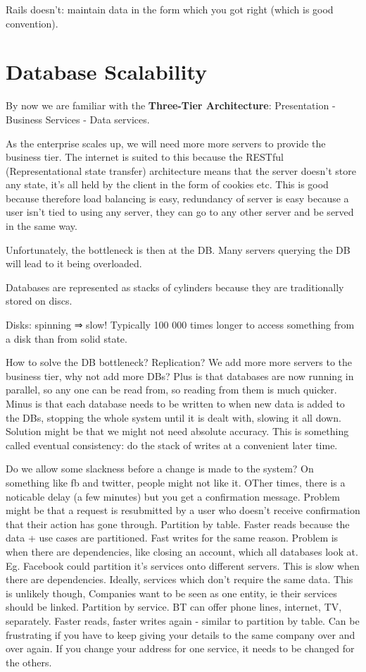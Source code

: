 \documentclass[11pt]{article}
\begin{document}
Rails doesn’t: maintain data in the form  which you got right (which is good convention).



\section{Database Scalability}

By now we are familiar with the \textbf{Three-Tier Architecture}: Presentation - Business Services - Data services.

As the enterprise scales up, we will need more more servers to provide the business tier. The internet is suited to this because the RESTful (Representational state transfer) architecture means that the server doesn’t store any state, it’s all held by the client in the form of cookies etc. This is good because therefore load balancing is easy, redundancy of server is easy because a user isn’t tied to using any server, they can go to any other server and be served in the same way.

Unfortunately, the bottleneck is then at the DB. Many servers querying the DB will lead to it being overloaded.

Databases are represented as stacks of cylinders because they are traditionally stored on discs.

Disks: spinning ⇒ slow! Typically 100 000 times longer to access something from a disk than from solid state.

How to solve the DB bottleneck?
Replication? We add more more servers to the business tier, why not add more DBs? Plus is that databases are now running in parallel, so any one can be read from, so reading from them is much quicker. Minus is that each database needs to be written to when new data is added to the DBs, stopping the whole system until it is dealt with, slowing it all down. Solution might be that we might not need absolute accuracy. This is something called eventual consistency: do the stack of writes at a convenient later time.

Do we allow some slackness before a change is made to the system? On something like fb and twitter, people might not like it. OTher times, there is a noticable delay (a few minutes) but you get a confirmation message. Problem might be that a request is resubmitted by a user who doesn’t receive confirmation that their action has gone through.
Partition by table. Faster reads because the data + use cases are partitioned. Fast writes for the same reason. Problem is when there are dependencies, like closing an account, which all databases look at. Eg. Facebook could partition it’s services onto different servers. This is slow when there are dependencies. Ideally, services which don’t require the same data. This is unlikely though, Companies want to be seen as one entity, ie their services should be linked.
Partition by service. BT can offer phone lines, internet, TV, separately. Faster reads, faster writes again - similar to partition by table. Can be frustrating if you have to keep giving your details to the same company over and over again. If you change your address for one service, it needs to be changed for the others. 
\end{document}
